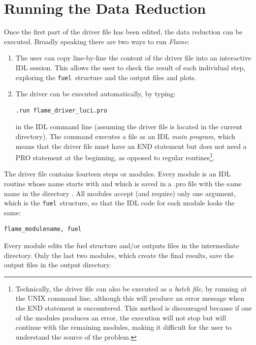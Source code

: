 \documentclass[a4paper]{article}
\newcommand{\flame}{\emph{Flame}}
\newcommand{\fuel}{\texttt{fuel}}
\begin{document}
\begin{sloppypar}
\section{Running the Data Reduction}
\label{sec:data_reduction}

Once the first part of the driver file has been edited, the data reduction can be executed. Broadly speaking there are two ways to run \flame:
\begin{enumerate}
\item The user can copy line-by-line the content of the driver file into an interactive IDL session. This allows the user to check the result of each individual step, exploring the \fuel\ structure and the output files and plots.

\item The driver can be executed automatically, by typing:
\begin{lstlisting}
.run flame_driver_luci.pro
\end{lstlisting}
in the IDL command line (assuming the driver file is located in the current directory). The  command executes a file as an IDL \emph{main program}, which means that the driver file must have an END statement but does not need a PRO statement at the beginning, as opposed to regular routines\footnote{Technically, the driver file can also be executed as a \emph{batch file}, by running  at the UNIX command line, although this will produce an error message when the END statement is encountered. This method is discouraged because if one of the modules produces an error, the execution will not stop but will continue with the remaining modules, making it difficult for the user to understand the source of the problem.}.
\end{enumerate}

The driver file contains fourteen steps or modules. Every module is an IDL routine whose name starts with  and which is saved in a .pro file with the same name in the directory . All modules accept (and require) only one argument, which is the \fuel\ structure, so that the IDL code for each module looks the same:
\begin{lstlisting}
flame_modulename, fuel
\end{lstlisting}

Every module edits the fuel structure and/or outputs files in the intermediate directory. Only the last two modules, which create the final results, save the output files in the output directory.


\end{sloppypar}
\end{document}
